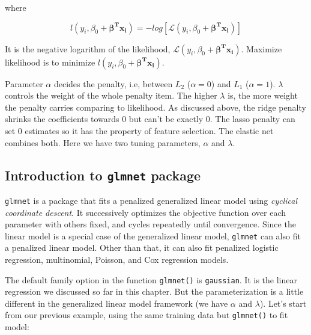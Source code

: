 \documentclass[12pt,]{krantz}
\begin{document}
where

\[l(y_{i},\beta_{0}+\symbf{\beta^{T}x_{i}})=-log[\mathcal{L}(y_{i},\beta_{0}+\symbf{\beta^{T}x_{i}})]\]

It is the negative logarithm of the likelihood, \(\mathcal{L}(y_{i},\beta_{0}+\symbf{\beta^{T}x_{i}})\). Maximize likelihood is to minimize \(l(y_{i},\beta_{0}+\symbf{\beta^{T}x_{i}})\).

Parameter \(\alpha\) decides the penalty, i.e, between \(L_2\) (\(\alpha=0\)) and \(L_1\) (\(\alpha=1\)). \(\lambda\) controls the weight of the whole penalty item. The higher \(\lambda\) is, the more weight the penalty carries comparing to likelihood. As discussed above, the ridge penalty shrinks the coefficients towards 0 but can't be exactly 0. The lasso penalty can set 0 estimates so it has the property of feature selection. The elastic net combines both. Here we have two tuning parameters, \(\alpha\) and \(\lambda\).

\hypertarget{introduction-to-glmnet-package}{%
\subsection{\texorpdfstring{Introduction to \texttt{glmnet} package}{Introduction to glmnet package}}\label{introduction-to-glmnet-package}}

\texttt{glmnet} is a package that fits a penalized generalized linear model using \emph{cyclical coordinate descent}. It successively optimizes the objective function over each parameter with others fixed, and cycles repeatedly until convergence. Since the linear model is a special case of the generalized linear model, \texttt{glmnet} can also fit a penalized linear model. Other than that, it can also fit penalized logistic regression, multinomial, Poisson, and Cox regression models.

The default family option in the function \texttt{glmnet()} is \texttt{gaussian}. It is the linear regression we discussed so far in this chapter. But the parameterization is a little different in the generalized linear model framework (we have \(\alpha\) and \(\lambda\)). Let's start from our previous example, using the same training data but \texttt{glmnet()} to fit model:
\end{document}
